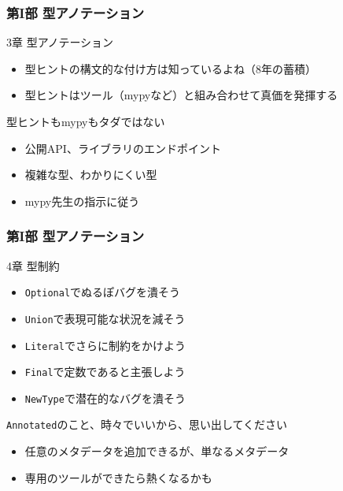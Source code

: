 \documentclass[aspectratio=169,dvipdfmx,12pt,notheorems]{beamer}
\theoremstyle{definition}
\begin{document}
\begin{frame}\frametitle{第I部 型アノテーション}

\begin{block}{3章 型アノテーション}
\begin{itemize}
\item 型ヒントの構文的な付け方は知っているよね（8年の蓄積）
\item 型ヒントはツール（mypyなど）と組み合わせて真価を発揮する
\end{itemize}

\end{block}

\begin{alertblock}{型ヒントもmypyもタダではない}
\begin{itemize}
\item 公開API、ライブラリのエンドポイント
\item 複雑な型、わかりにくい型
\item mypy先生の指示に従う
\end{itemize}
\end{alertblock}

\end{frame}

\begin{frame}\frametitle{第I部 型アノテーション}

\begin{block}{4章 型制約}
\begin{itemize}
\item \texttt{Optional}でぬるぽバグを潰そう
\item \texttt{Union}で表現可能な状況を減そう
\item \texttt{Literal}でさらに制約をかけよう
\item \texttt{Final}で定数であると主張しよう
\item \texttt{NewType}で潜在的なバグを潰そう
\end{itemize}

\end{block}

\begin{alertblock}{\texttt{Annotated}のこと、時々でいいから、思い出してください}
\begin{itemize}
\item 任意のメタデータを追加できるが、単なるメタデータ
\item 専用のツールができたら熱くなるかも
\end{itemize}
\end{alertblock}

\end{frame}
\end{document}

